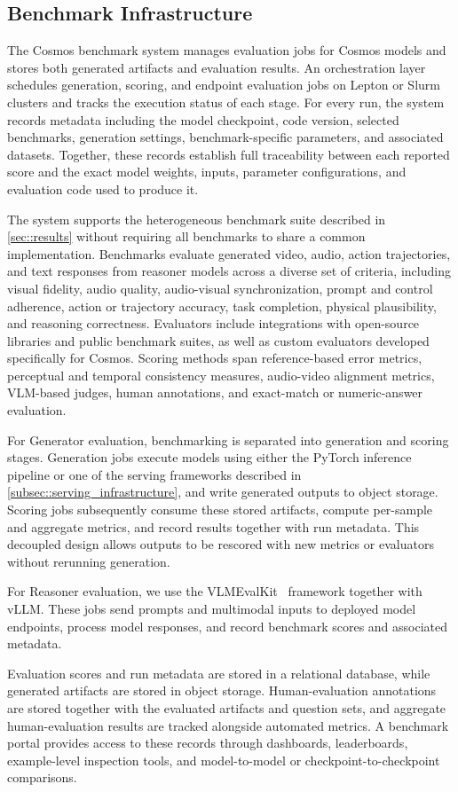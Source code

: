\subsection{Benchmark Infrastructure}
\label{subsec::benchmark_infra}

The Cosmos benchmark system manages evaluation jobs for Cosmos models and stores both generated artifacts and evaluation results. An orchestration layer schedules generation, scoring, and endpoint evaluation jobs on Lepton or Slurm clusters and tracks the execution status of each stage. For every run, the system records metadata including the model checkpoint, code version, selected benchmarks, generation settings, benchmark-specific parameters, and associated datasets. Together, these records establish full traceability between each reported score and the exact model weights, inputs, parameter configurations, and evaluation code used to produce it.

The system supports the heterogeneous benchmark suite described in \cref{sec::results} without requiring all benchmarks to share a common implementation. Benchmarks evaluate generated video, audio, action trajectories, and text responses from reasoner models across a diverse set of criteria, including visual fidelity, audio quality, audio-visual synchronization, prompt and control adherence, action or trajectory accuracy, task completion, physical plausibility, and reasoning correctness. Evaluators include integrations with open-source libraries and public benchmark suites, as well as custom evaluators developed specifically for Cosmos. Scoring methods span reference-based error metrics, perceptual and temporal consistency measures, audio-video alignment metrics, VLM-based judges, human annotations, and exact-match or numeric-answer evaluation.

For Generator evaluation, benchmarking is separated into generation and scoring stages. Generation jobs execute models using either the PyTorch inference pipeline or one of the serving frameworks described in \cref{subsec::serving_infrastructure}, and write generated outputs to object storage. Scoring jobs subsequently consume these stored artifacts, compute per-sample and aggregate metrics, and record results together with run metadata. This decoupled design allows outputs to be rescored with new metrics or evaluators without rerunning generation.

For Reasoner evaluation, we use the VLMEvalKit~\citep{duan2024vlmevalkit} framework together with vLLM. These jobs send prompts and multimodal inputs to deployed model endpoints, process model responses, and record benchmark scores and associated metadata.

Evaluation scores and run metadata are stored in a relational database, while generated artifacts are stored in object storage. Human-evaluation annotations are stored together with the evaluated artifacts and question sets, and aggregate human-evaluation results are tracked alongside automated metrics. A benchmark portal provides access to these records through dashboards, leaderboards, example-level inspection tools, and model-to-model or checkpoint-to-checkpoint comparisons.
